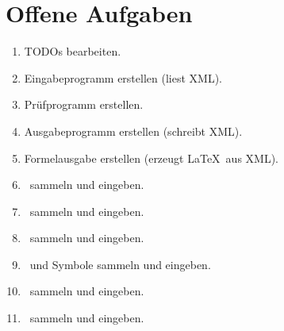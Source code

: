 \section     {Offene Aufgaben}%
\label   {sec:OffeneAufgaben}

\begin{enumerate}
	\item TODOs bearbeiten.
	\item Eingabeprogramm erstellen (liest XML).
	\item Prüfprogramm erstellen.
	\item Ausgabeprogramm erstellen (schreibt XML).
	\item Formelausgabe erstellen (erzeugt \LaTeX\ aus XML).
	\item \Axiome\ sammeln und eingeben.
	\item \Saetze\ sammeln und eingeben.
	\item \Beweise\ sammeln und eingeben.
	\item \Fachbegriffe\ und Symbole sammeln und eingeben.
	\item \Fachgebiete\ sammeln und eingeben.
	\item \Ausgabeschemata\ sammeln und eingeben.
\end{enumerate}

\Endchapter
